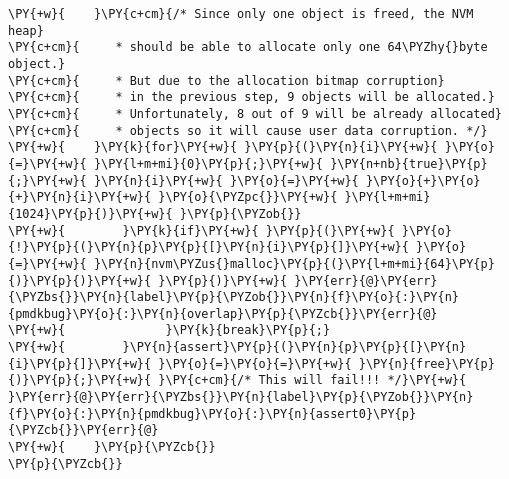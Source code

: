 \begin{Verbatim}[commandchars=\\\{\},codes={\catcode`\$=3\catcode`\^=7\catcode`\_=8\relax}]
\PY{+w}{    }\PY{c+cm}{/* Since only one object is freed, the NVM heap}
\PY{c+cm}{     * should be able to allocate only one 64\PYZhy{}byte object.}
\PY{c+cm}{     * But due to the allocation bitmap corruption}
\PY{c+cm}{     * in the previous step, 9 objects will be allocated.}
\PY{c+cm}{     * Unfortunately, 8 out of 9 will be already allocated}
\PY{c+cm}{     * objects so it will cause user data corruption. */}
\PY{+w}{    }\PY{k}{for}\PY{+w}{ }\PY{p}{(}\PY{n}{i}\PY{+w}{ }\PY{o}{=}\PY{+w}{ }\PY{l+m+mi}{0}\PY{p}{;}\PY{+w}{ }\PY{n+nb}{true}\PY{p}{;}\PY{+w}{ }\PY{n}{i}\PY{+w}{ }\PY{o}{=}\PY{+w}{ }\PY{o}{+}\PY{o}{+}\PY{n}{i}\PY{+w}{ }\PY{o}{\PYZpc{}}\PY{+w}{ }\PY{l+m+mi}{1024}\PY{p}{)}\PY{+w}{ }\PY{p}{\PYZob{}}
\PY{+w}{        }\PY{k}{if}\PY{+w}{ }\PY{p}{(}\PY{+w}{ }\PY{o}{!}\PY{p}{(}\PY{n}{p}\PY{p}{[}\PY{n}{i}\PY{p}{]}\PY{+w}{ }\PY{o}{=}\PY{+w}{ }\PY{n}{nvm\PYZus{}malloc}\PY{p}{(}\PY{l+m+mi}{64}\PY{p}{)}\PY{p}{)}\PY{+w}{ }\PY{p}{)}\PY{+w}{ }\PY{err}{@}\PY{err}{\PYZbs{}}\PY{n}{label}\PY{p}{\PYZob{}}\PY{n}{f}\PY{o}{:}\PY{n}{pmdkbug}\PY{o}{:}\PY{n}{overlap}\PY{p}{\PYZcb{}}\PY{err}{@}
\PY{+w}{              }\PY{k}{break}\PY{p}{;}
\PY{+w}{        }\PY{n}{assert}\PY{p}{(}\PY{n}{p}\PY{p}{[}\PY{n}{i}\PY{p}{]}\PY{+w}{ }\PY{o}{=}\PY{o}{=}\PY{+w}{ }\PY{n}{free}\PY{p}{)}\PY{p}{;}\PY{+w}{ }\PY{c+cm}{/* This will fail!!! */}\PY{+w}{ }\PY{err}{@}\PY{err}{\PYZbs{}}\PY{n}{label}\PY{p}{\PYZob{}}\PY{n}{f}\PY{o}{:}\PY{n}{pmdkbug}\PY{o}{:}\PY{n}{assert0}\PY{p}{\PYZcb{}}\PY{err}{@}
\PY{+w}{    }\PY{p}{\PYZcb{}}
\PY{p}{\PYZcb{}}
\end{Verbatim}
